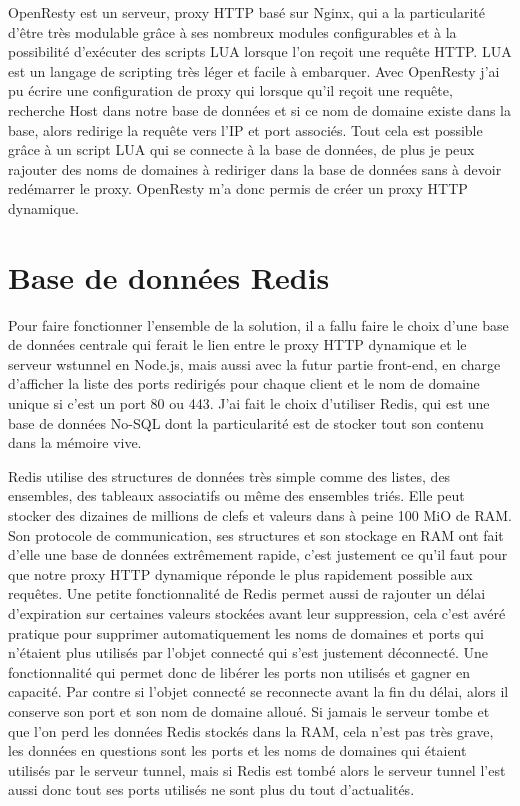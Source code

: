 OpenResty est un serveur, proxy HTTP basé sur Nginx, qui a la
particularité d'être très modulable grâce à ses nombreux modules
configurables et à la possibilité d'exécuter des scripts LUA lorsque
l'on reçoit une requête HTTP. LUA est un langage de scripting très
léger et facile à embarquer. Avec OpenResty j'ai pu écrire une
configuration de proxy qui lorsque qu'il reçoit une requête, recherche
\og Host \fg{} dans notre base de données et si ce nom de domaine
existe dans la base, alors redirige la requête vers l'IP et port
associés. Tout cela est possible grâce à un script LUA qui se connecte
à la base de données, de plus je peux rajouter des noms de domaines à
rediriger dans la base de données sans à devoir redémarrer le
proxy. OpenResty m'a donc permis de créer un proxy HTTP dynamique.

\section{Base de données Redis}

Pour faire fonctionner l'ensemble de la solution, il a fallu faire le
choix d'une base de données centrale qui ferait le lien entre le proxy
HTTP dynamique et le serveur wstunnel en Node.js, mais aussi avec la
futur partie front-end, en charge d'afficher la liste des ports
redirigés pour chaque client et le nom de domaine unique si c'est un
port 80 ou 443. J'ai fait le choix d'utiliser Redis, qui est une base
de données No-SQL dont la particularité est de stocker tout son
contenu dans la mémoire vive.

Redis utilise des structures de données très simple comme des listes,
des ensembles, des tableaux associatifs ou même des ensembles
triés. Elle peut stocker des dizaines de millions de clefs et valeurs
dans à peine 100 MiO de RAM. Son protocole de communication, ses
structures et son stockage en RAM ont fait d'elle une base de données
extrêmement rapide, c'est justement ce qu'il faut pour que notre proxy
HTTP dynamique réponde le plus rapidement possible aux requêtes. Une
petite fonctionnalité de Redis permet aussi de rajouter un délai
d'expiration sur certaines valeurs stockées avant leur suppression,
cela c'est avéré pratique pour supprimer automatiquement les noms de
domaines et ports qui n'étaient plus utilisés par l'objet connecté qui
s'est justement déconnecté. Une fonctionnalité qui permet donc de
libérer les ports non utilisés et gagner en capacité. Par contre si
l'objet connecté se reconnecte avant la fin du délai, alors il
conserve son port et son nom de domaine alloué. Si jamais le serveur
tombe et que l'on perd les données Redis stockés dans la RAM, cela
n'est pas très grave, les données en questions sont les ports et les
noms de domaines qui étaient utilisés par le serveur tunnel, mais si
Redis est tombé alors le serveur tunnel l'est aussi donc tout ses
ports utilisés ne sont plus du tout d'actualités.

